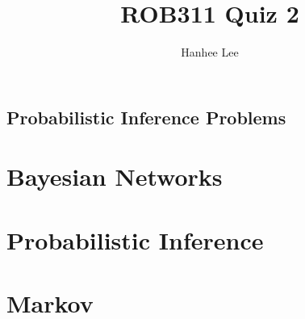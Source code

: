 \documentclass{article}
\title{ROB311 Quiz 2}
\author{Hanhee Lee}
\begin{document}
\maketitle

\tableofcontents
\newpage

\begin{center}
    \section*{Probabilistic Inference Problems}
\end{center}

\section{Bayesian Networks}

\newpage

\section{Probabilistic Inference}

\newpage

\section{Markov }

\newpage
\end{document}
